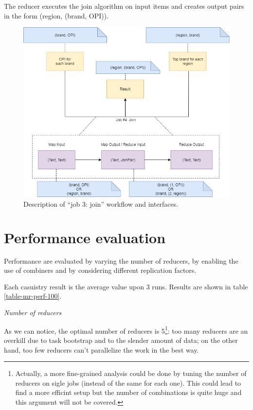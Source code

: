 The reducer executes the join algorithm on input items and creates output pairs in the form (region, (brand, OPI)). 

\begin{figure}[H]
	\centering
	\includegraphics[scale=0.7]{images/2-mapreduce/MR-job-3.png}
	\caption{Description of ``job 3: join'' workflow and interfaces.}
	\label{fig:MR-job-3}
\end{figure}  

\newpage
\section{Performance evaluation}

Performance are evaluated by varying the number of reducers, by enabling the use of combiners and by considering different replication factors.

Each casuistry result is the average value upon 3 runs. Results are shown in table \ref{table-mr-perf-100}.

\bigskip
\textit{Number of reducers}
\bigskip

As we can notice, the optimal number of reducers is 5\footnote{Actually, a more fine-grained analysis could be done by tuning the number of reducers on sigle jobs (instead of the same for each one). This could lead to find a more efficint setup but the number of combinations is quite huge and this argument will not be covered. }: too many reducers are an overkill due to task bootstrap and to the slender amount of data; on the other hand, too few reducers can't parallelize the work in the best way.

